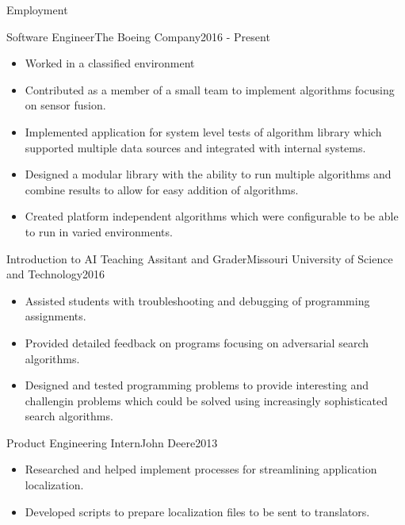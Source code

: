 \documentclass[]{mcdowellcv}
\begin{document}
	\makeheader
	
	\begin{cvsection}{Employment}

        \begin{cvsubsection}{Software Engineer}{The Boeing Company}{2016 - Present}			
			\begin{itemize}
				\item Worked in a classified environment
				\item Contributed as a member of a small team to implement algorithms focusing on sensor fusion.
				\item Implemented application for system level tests of algorithm library which supported multiple data sources and integrated with internal systems. 
                \item Designed a modular library with the ability to run multiple algorithms and combine results to allow for easy addition of algorithms.
                \item Created platform independent algorithms which were configurable to be able to run in varied environments.
			\end{itemize}
		\end{cvsubsection}
		
        \begin{cvsubsection}[2]{Introduction to AI Teaching Assitant and Grader}{Missouri University of Science and Technology}{2016}	
			\begin{itemize}
                \item Assisted students with troubleshooting and debugging of programming assignments.
                \item Provided detailed feedback on programs focusing on adversarial search algorithms.
                \item Designed and tested programming problems to provide interesting and challengin problems which could be solved using increasingly sophisticated search algorithms.
			\end{itemize}
		\end{cvsubsection}

        \begin{cvsubsection}{Product Engineering Intern}{John Deere}{2013}
            \begin{itemize}
                \item Researched and helped implement processes for streamlining application localization.
                \item Developed scripts to prepare localization files to be sent to translators.
            \end{itemize}
        \end{cvsubsection}
		

\end{cvsection}
\end{document}
